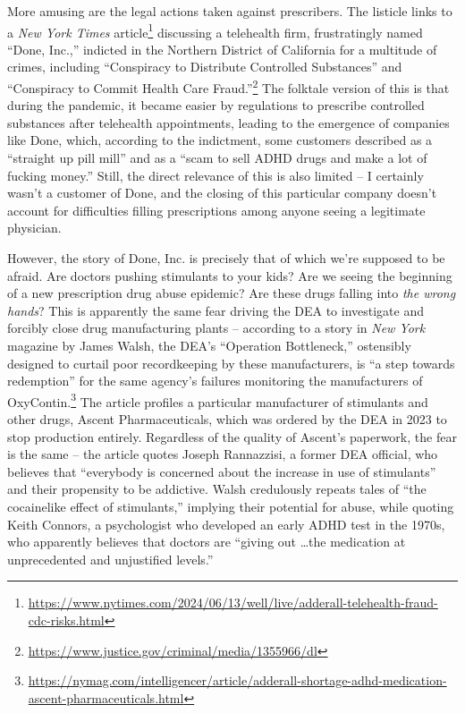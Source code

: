 \documentclass[11pt]{article}
\begin{document}
    More amusing are the legal actions taken against prescribers. The listicle links to a \textit{New York Times} article\footnote{\url{https://www.nytimes.com/2024/06/13/well/live/adderall-telehealth-fraud-cdc-risks.html}} discussing a telehealth firm, frustratingly named ``Done, Inc.,'' indicted in the Northern District of California for a multitude of crimes, including ``Conspiracy to Distribute Controlled Substances'' and ``Conspiracy to Commit Health Care Fraud.''\footnote{\url{https://www.justice.gov/criminal/media/1355966/dl}} The folktale version of this is that during the pandemic, it became easier by regulations to prescribe controlled substances after telehealth appointments, leading to the emergence of companies like Done, which, according to the indictment, some customers described as a ``straight up pill mill'' and as a ``scam to sell ADHD drugs and make a lot of fucking money.'' Still, the direct relevance of this is also limited -- I certainly wasn't a customer of Done, and the closing of this particular company doesn't account for difficulties filling prescriptions among anyone seeing a legitimate physician.

    However, the story of Done, Inc. is precisely that of which we're supposed to be afraid. Are doctors pushing stimulants to your kids? Are we seeing the beginning of a new prescription drug abuse epidemic? Are these drugs falling into \textit{the wrong hands}? This is apparently the same fear driving the DEA to investigate and forcibly close drug manufacturing plants -- according to a story in \textit{New York} magazine by James Walsh, the DEA's ``Operation Bottleneck,'' ostensibly designed to curtail poor recordkeeping by these manufacturers, is ``a step towards redemption'' for the same agency's failures monitoring the manufacturers of OxyContin.\footnote{\url{https://nymag.com/intelligencer/article/adderall-shortage-adhd-medication-ascent-pharmaceuticals.html}} The article profiles a particular manufacturer of stimulants and other drugs, Ascent Pharmaceuticals, which was ordered by the DEA in 2023 to stop production entirely. Regardless of the quality of Ascent's paperwork, the fear is the same -- the article quotes Joseph Rannazzisi, a former DEA official, who believes that ``everybody is concerned about the increase in use of stimulants'' and their propensity to be addictive. Walsh credulously repeats tales of ``the cocainelike effect of stimulants,'' implying their potential for abuse, while quoting Keith Connors, a psychologist who developed an early ADHD test in the 1970s, who apparently believes that doctors are ``giving out \dots the medication at unprecedented and unjustified levels.'' 
\end{document}
